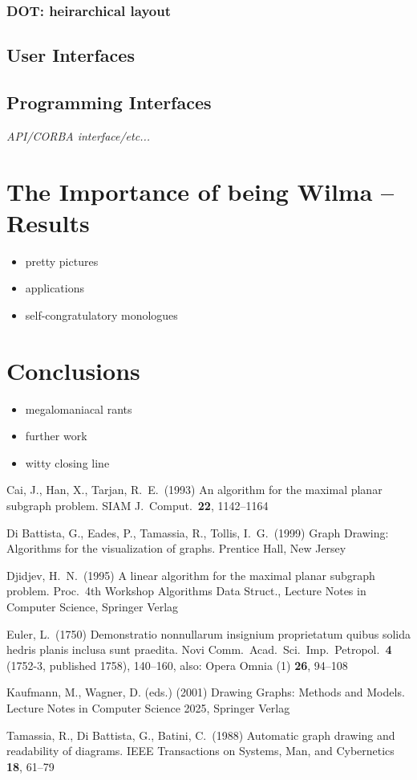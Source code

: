 \documentclass[runningheads]{cl2emult}
\begin{document}
\subsubsection{DOT: heirarchical layout}
\subsection{User Interfaces}
\subsection{Programming Interfaces}
\em{API/CORBA interface/etc...}

\section{The Importance of being Wilma -- Results}
\begin{itemize}
\item pretty pictures
\item applications
\item self-congratulatory monologues
\end{itemize}

\section{Conclusions}
\begin{itemize}
\item megalomaniacal rants
\item further work
\item witty closing line
\end{itemize}

\begin{thebibliography}{7}
%

 Cai, J., Han, X., Tarjan, R.~E.\ (1993)
An algorithm for the maximal planar subgraph
problem.
SIAM J.\ Comput.\ {\bf22}, 1142--1164

 Di Battista, G., Eades, P., Tamassia, R., Tollis,
  I.~G.\ (1999)
Graph Drawing: Algorithms for the visualization of graphs.
Prentice Hall, New Jersey

 Djidjev, H.~N.\ (1995)
A linear algorithm for the maximal planar subgraph problem.
Proc.\ 4th Workshop Algorithms Data Struct., 
Lecture Notes in Computer Science, Springer Verlag

 Euler, L.\ (1750)
Demonstratio nonnullarum insignium proprietatum quibus solida hedris
planis inclusa sunt praedita.
Novi Comm.\ Acad.\ Sci.\ Imp.\ Petropol.\ {\bf4} (1752-3, published
1758), 140--160, also: Opera Omnia (1) {\bf26}, 94--108

 Kaufmann, M., Wagner, D. (eds.) (2001)
Drawing Graphs: Methods and Models.
Lecture Notes in Computer Science 2025, Springer Verlag

 Tamassia, R., Di Battista, G., Batini, C.\ (1988)
Automatic graph drawing and readability of diagrams.
IEEE Transactions on Systems, Man, and Cybernetics {\bf18}, 61--79

\end{thebibliography}

\clearpage
{}
\flushbottom
\printindex
\end{document}
